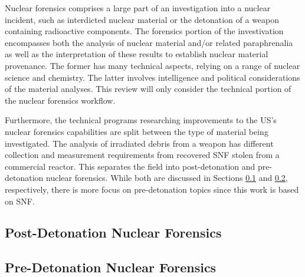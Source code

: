 Nuclear forensics comprises a large part of an investigation into a nuclear
incident, such as interdicted nuclear material or the detonation of a weapon
containing radioactive components.  The forensics portion of the investivation
encompasses both the analysis of nuclear material and/or related paraphrenalia
as well as the interpretation of these results to establish nuclear material
provenance. The former has many technical aspects, relying on a range of
nuclear science and chemistry.  The latter involves intelligence and political
considerations of the material analyses. This review will only consider the
technical portion of the nuclear forensics workflow.

Furthermore, the technical programs researching improvements to the \gls{US}'s
nuclear forensics capabilities are split between the type of material being
investigated. The analysis of irradiated debris from a weapon has different
collection and measurement requirements from recovered \gls{SNF} stolen from a
commercial reactor. This separates the field into post-detonation and pre-detonation 
nuclear forensics. While both are discussed in Sections \ref{sec:postdet} 
and \ref{sec:predet}, respectively, there is more focus on pre-detonation 
topics since this work is based on \gls{SNF}.

\subsection{Post-Detonation Nuclear Forensics}
\label{sec:postdet}


\subsection{Pre-Detonation Nuclear Forensics}
\label{sec:predet}




